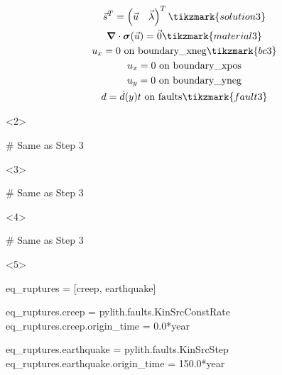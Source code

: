 \documentclass[aspectratio=169]{beamer}
\begin{document}
\begin{frame}[t,fragile]
  \vspace*{-2\baselineskip}
  \begin{minipage}[t]{0.3\textwidth}
    {\scriptsize
    \begin{gather*}
    \vec{s}^T = \left( \vec{u} \quad \vec{\lambda} \right)^T \tikzmark{solution3}\\
    \tensor{\nabla} \cdot \tensor{\sigma}(\vec{u}) = \vec{0} \tikzmark{material3}\\
    u_x = 0 \text{ on boundary\_xneg} \tikzmark{bc3}\\
    u_x = 0 \text{ on boundary\_xpos} \\
    u_y = 0 \text{ on boundary\_yneg} \\
    d = \dot{d}(y) t \text{ on faults} \tikzmark{fault3}
    \end{gather*}}
  \end{minipage}
  \hfill
  \begin{minipage}[t]{0.67\textwidth}
    \begin{onlyenv}<2>
      \begin{cfgcode}
        # Same as Step 3
      \end{cfgcode}
    \end{onlyenv}
    \begin{onlyenv}<3>
      \begin{cfgcode}
        # Same as Step 3
      \end{cfgcode}
    \end{onlyenv}
    \begin{onlyenv}<4>
      \begin{cfgcode}
        # Same as Step 3
      \end{cfgcode}
    \end{onlyenv}
    \begin{onlyenv}<5>
      \begin{cfgcode}
        eq_ruptures = [creep, earthquake]

        eq_ruptures.creep = pylith.faults.KinSrcConstRate
        eq_ruptures.creep.origin_time = 0.0*year

        eq_ruptures.earthquake = pylith.faults.KinSrcStep
        eq_ruptures.earthquake.origin_time = 150.0*year


\end{cfgcode}
\end{onlyenv}
\end{minipage}
\end{frame}
\end{document}
